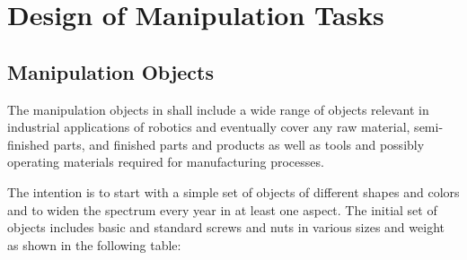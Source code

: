 \section{Design of Manipulation Tasks}
\label{sec:ManipulationTasks}

\subsection{Manipulation Objects}
The manipulation objects in \RCAW shall include a wide range of objects relevant in industrial applications of robotics and eventually cover any raw material, semi-finished parts, and finished parts and products as well as tools and possibly operating materials required for manufacturing processes.
\par
The intention is to start with a simple set of objects of different shapes and colors and to widen the spectrum every year in at least one aspect. The initial set of objects includes basic and standard screws and nuts in various sizes and weight as shown in the following table:


\newlength{\myColumWidth}
\setlength{\myColumWidth}{2cm}
\newcommand{\imageView}[1]{\raisebox{-.5\height}[1.4cm][1.3cm]{\texttt{[image: \#1]}}}


